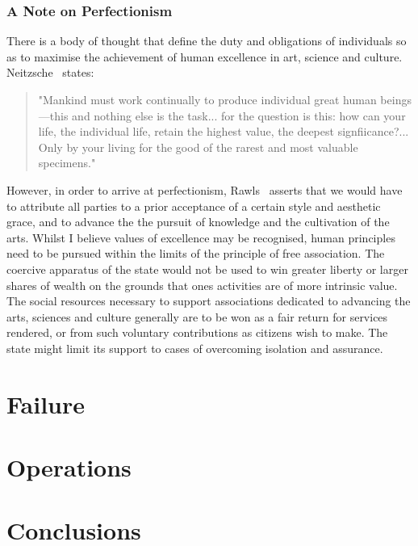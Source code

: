 \documentclass[11pt, oneside]{article}   	%
\begin{document}
\subsubsection{A Note on Perfectionism}

There is a body of thought that define the duty and obligations of individuals so as to maximise the achievement of human excellence in art, science and culture. Neitzsche~\cite{gam1} states:
\begin{quote}
"Mankind must work continually to produce individual great human beings---this and nothing else is the task... for the question is this: how can your life, the individual life, retain the highest value, the deepest signfiicance?... Only by your living for the good of the rarest and most valuable specimens."
\end{quote}
However, in order to arrive at perfectionism, Rawls~\cite{jr2} asserts that we would have to attribute all parties to a prior acceptance of a certain style and aesthetic grace, and to advance the the pursuit of knowledge and the cultivation of the arts. Whilst I believe values of excellence may be recognised, human principles need to be pursued within the limits of the principle of free association. The coercive apparatus of the state would not be used to win greater liberty or larger shares of wealth on the grounds that ones activities are of more intrinsic value. The social resources necessary to support associations dedicated to advancing the arts, sciences and culture generally are to be won as a fair return for services rendered, or from such voluntary contributions as citizens wish to make. The state might limit its support to cases of overcoming isolation and assurance.



\section{Failure}


\section{Operations}


\section{Conclusions}
\end{document}
